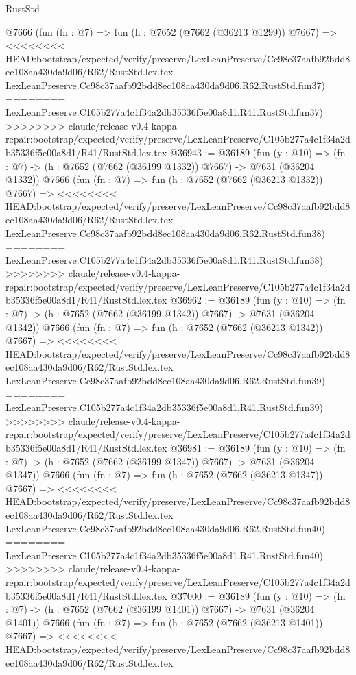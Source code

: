 \begin{lexlean}{RustStd}
\begin{coremodule}
{\begin{coremodule}
{{{{{{{{{{{{{{{{{{{{{{{{{{{{{{{{{{{{{{{{{{{{{{{{{{{{{    @7666
    (fun (fn : @7) =>
    fun (h : @7652 (@7662 (@36213 @1299)) @7667) =>
<<<<<<<< HEAD:bootstrap/expected/verify/preserve/LexLeanPreserve/Cc98c37aafb92bdd8ec108aa430da9d06/R62/RustStd.lex.tex
    LexLeanPreserve.Cc98c37aafb92bdd8ec108aa430da9d06.R62.RustStd.fun37)
========
    LexLeanPreserve.C105b277a4c1f34a2db35336f5e00a8d1.R41.RustStd.fun37)
>>>>>>>> claude/release-v0.4-kappa-repair:bootstrap/expected/verify/preserve/LexLeanPreserve/C105b277a4c1f34a2db35336f5e00a8d1/R41/RustStd.lex.tex
@36943 := @36189
    (fun (y : @10) => (fn : @7) -> (h : @7652 (@7662 (@36199 @1332)) @7667) -> @7631 (@36204 @1332))
    @7666
    (fun (fn : @7) =>
    fun (h : @7652 (@7662 (@36213 @1332)) @7667) =>
<<<<<<<< HEAD:bootstrap/expected/verify/preserve/LexLeanPreserve/Cc98c37aafb92bdd8ec108aa430da9d06/R62/RustStd.lex.tex
    LexLeanPreserve.Cc98c37aafb92bdd8ec108aa430da9d06.R62.RustStd.fun38)
========
    LexLeanPreserve.C105b277a4c1f34a2db35336f5e00a8d1.R41.RustStd.fun38)
>>>>>>>> claude/release-v0.4-kappa-repair:bootstrap/expected/verify/preserve/LexLeanPreserve/C105b277a4c1f34a2db35336f5e00a8d1/R41/RustStd.lex.tex
@36962 := @36189
    (fun (y : @10) => (fn : @7) -> (h : @7652 (@7662 (@36199 @1342)) @7667) -> @7631 (@36204 @1342))
    @7666
    (fun (fn : @7) =>
    fun (h : @7652 (@7662 (@36213 @1342)) @7667) =>
<<<<<<<< HEAD:bootstrap/expected/verify/preserve/LexLeanPreserve/Cc98c37aafb92bdd8ec108aa430da9d06/R62/RustStd.lex.tex
    LexLeanPreserve.Cc98c37aafb92bdd8ec108aa430da9d06.R62.RustStd.fun39)
========
    LexLeanPreserve.C105b277a4c1f34a2db35336f5e00a8d1.R41.RustStd.fun39)
>>>>>>>> claude/release-v0.4-kappa-repair:bootstrap/expected/verify/preserve/LexLeanPreserve/C105b277a4c1f34a2db35336f5e00a8d1/R41/RustStd.lex.tex
@36981 := @36189
    (fun (y : @10) => (fn : @7) -> (h : @7652 (@7662 (@36199 @1347)) @7667) -> @7631 (@36204 @1347))
    @7666
    (fun (fn : @7) =>
    fun (h : @7652 (@7662 (@36213 @1347)) @7667) =>
<<<<<<<< HEAD:bootstrap/expected/verify/preserve/LexLeanPreserve/Cc98c37aafb92bdd8ec108aa430da9d06/R62/RustStd.lex.tex
    LexLeanPreserve.Cc98c37aafb92bdd8ec108aa430da9d06.R62.RustStd.fun40)
========
    LexLeanPreserve.C105b277a4c1f34a2db35336f5e00a8d1.R41.RustStd.fun40)
>>>>>>>> claude/release-v0.4-kappa-repair:bootstrap/expected/verify/preserve/LexLeanPreserve/C105b277a4c1f34a2db35336f5e00a8d1/R41/RustStd.lex.tex
@37000 := @36189
    (fun (y : @10) => (fn : @7) -> (h : @7652 (@7662 (@36199 @1401)) @7667) -> @7631 (@36204 @1401))
    @7666
    (fun (fn : @7) =>
    fun (h : @7652 (@7662 (@36213 @1401)) @7667) =>
<<<<<<<< HEAD:bootstrap/expected/verify/preserve/LexLeanPreserve/Cc98c37aafb92bdd8ec108aa430da9d06/R62/RustStd.lex.tex
}}}}}}}}}}}}}}}}}}}}}}}}}}}}}}}}}}}}}}}}}}}}}}}}}}}}}
\end{coremodule}}
\end{coremodule}
\end{lexlean}
